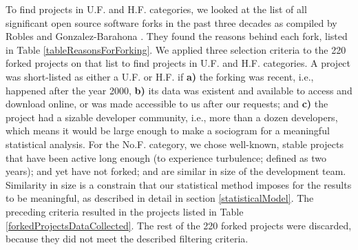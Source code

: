 \documentclass[11pt]{report}
\begin{document}
To find projects in U.F. and H.F. categories, we looked at the list of all significant open source software forks in the past three decades as compiled by Robles and Gonzalez-Barahona \cite{Robles}. They found the reasons behind each fork, listed in Table \ref{tableReasonsForForking}. We applied three selection criteria to the 220 forked projects on that list to find projects in U.F. and H.F. categories. A project was short-listed as either a U.F. or H.F. if \textbf{a)} the forking was recent, i.e., happened after the year 2000, \textbf{b)} its data was existent and available to access and download online, or was made accessible to us after our requests; and \textbf{c)} the project had a sizable developer community, i.e., more than a dozen developers, which means it would be large enough to make a sociogram for a meaningful statistical analysis. For the No.F. category, we chose well-known, stable projects that have been active long enough (to experience turbulence; defined as two years); and yet have not forked; and are similar in size of the development team. Similarity in size is a constrain that our statistical method imposes for the results to be meaningful, as described in detail in section \ref{statisticalModel}.  The preceding criteria resulted in the projects listed in Table \ref{forkedProjectsDataCollected}. The rest of the 220 forked projects were discarded, because they did not meet the described filtering criteria.
\end{document}
